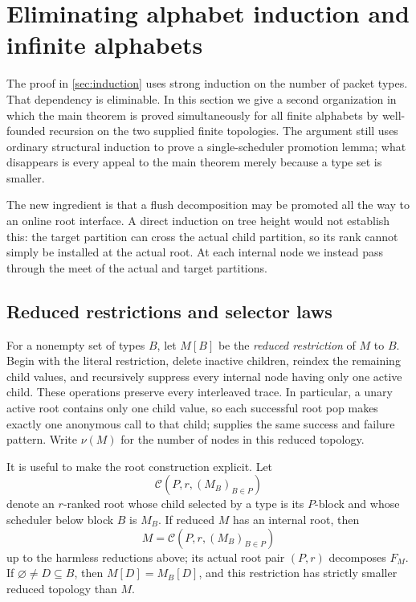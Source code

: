 \section{Eliminating alphabet induction and infinite alphabets}
\label{sec:infinite-alphabets}

The proof in \autoref{sec:induction} uses strong induction on the number of
packet types.  That dependency is eliminable.  In this section we give a
second organization in which the main theorem is proved simultaneously for
all finite alphabets by well-founded recursion on the two supplied finite
topologies.  The argument still uses ordinary structural induction to prove a
single-scheduler promotion lemma; what disappears is every appeal to the main
theorem merely because a type set is smaller.

The new ingredient is that a flush decomposition may be promoted all the way
to an online root interface.  A direct induction on tree height would not
establish this: the target partition can cross the actual child partition, so
its rank cannot simply be installed at the actual root.  At each internal
node we instead pass through the meet of the actual and target partitions.

\subsection{Reduced restrictions and selector laws}

For a nonempty set of types \(B\), let \(M[B]\) be the \emph{reduced
restriction} of \(M\) to \(B\).  Begin with the literal restriction, delete
inactive children, reindex the remaining child values, and recursively
suppress every internal node having only one active child.  These operations
preserve every interleaved trace.  In particular, a unary active root contains
only one child value, so each successful root pop makes exactly one anonymous
call to that child;  supplies the same success and failure
pattern.  Write \(\nu(M)\) for the number of nodes in this reduced topology.

It is useful to make the root construction explicit.  Let
\begin{equation}
 \mathcal C(P,r,(M_B)_{B\in P})
 \label{eq:selector-construction}
\end{equation}
denote an \(r\)-ranked root whose child selected by a type is its \(P\)-block
and whose scheduler below block \(B\) is \(M_B\).  If reduced \(M\) has an
internal root, then
\begin{equation}
 M=\mathcal C(P,r,(M_B)_{B\in P})
 \label{eq:reduced-root-presentation}
\end{equation}
up to the harmless reductions above; its actual root pair \((P,r)\)
decomposes \(F_M\).  If \(\varnothing\ne D\subseteq B\), then
\(M[D]=M_B[D]\), and this restriction has strictly smaller reduced topology
than \(M\).

